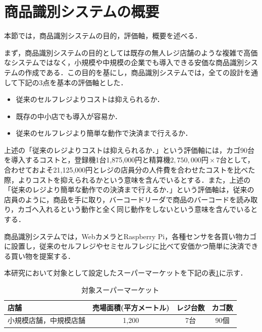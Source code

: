 

\section{商品識別システムの概要}

本節では，商品識別システムの目的，評価軸，概要を述べる．

まず，商品識別システムの目的としては既存の無人レジ店舗のような複雑で高価なシステムではなく，小規模や中規模の企業でも導入できる安価な商品識別システムの作成である．この目的を基にし，商品識別システムでは，全ての設計を通して下記の3点を基本の評価軸とした．

\begin{itemize}
\item 従来のセルフレジよりコストは抑えられるか．
\item 既存の中小店でも導入が容易か．
\item 従来のセルフレジより簡単な動作で決済まで行えるか．
\end{itemize}


上述の「従来のレジよりコストは抑えられるか．」という評価軸には，カゴ90台を導入するコストと，登録機1台1,875,000円と精算機$2,750,000円\times7台$として，合わせておよそ21,125,000円\cite{super}とレジの店員分の人件費を合わせたコストを比べた際，よりコストを抑えられるかという意味を含んでいるとする．また，上述の「従来のレジより簡単な動作での決済まで行えるか．」という評価軸は，従来の店員のように，商品を手に取り，バーコードリーダで商品のバーコードを読み取り，カゴへ入れるという動作と全く同じ動作をしないという意味を含んでいるとする．

商品識別システムでは，WebカメラとRaspberry Pi，各種センサを各買い物カゴに設置し，従来のセルフレジやセミセルフレジに比べて安価かつ簡単に決済できる買い物を提案する．

本研究において対象として設定したスーパーマーケットを下記の表\ref{taisho}に示す．


\begin{table}[htb]
\begin{center}
\caption{対象スーパーマーケット}
\begin{tabular}{|l|c|c|c|} \hline
店舗 & 売場面積(平方メートル) & レジ台数 & カゴ数 \\ \hline
小規模店舗，中規模店舗 & 1,200 & 7台 & 90個 \\ \hline
\end{tabular}
\label{taisho}
\end{center}
\end{table}


